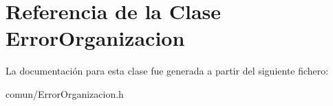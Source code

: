 \hypertarget{classErrorOrganizacion}{\section{\-Referencia de la \-Clase \-Error\-Organizacion}
\label{classErrorOrganizacion}
}


\-La documentación para esta clase fue generada a partir del siguiente fichero\-:\begin{DoxyCompactItemize}
\item 
comun/\-Error\-Organizacion.\-h\end{DoxyCompactItemize}
